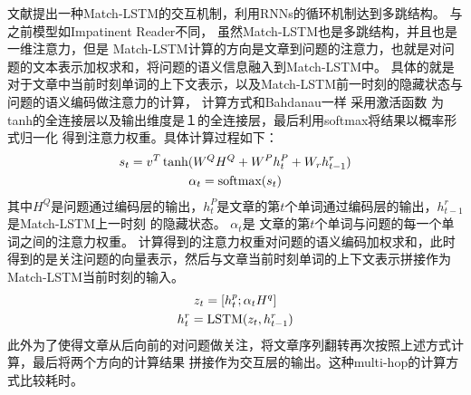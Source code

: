 文献\cite{MatchLSTM}提出一种Match-LSTM的交互机制，利用RNNs的循环机制达到多跳结构。
与之前模型如Impatinent Reader不同，
虽然Match-LSTM也是多跳结构，并且也是一维注意力，但是
Match-LSTM计算的方向是文章到问题的注意力，也就是对问题的文本表示加权求和，将问题的语义信息融入到Match-LSTM中。
具体的就是对于文章中当前时刻单词的上下文表示，以及Match-LSTM前一时刻的隐藏状态与问题的语义编码做注意力的计算，
计算方式和Bahdanau一样
采用激活函数
为tanh的全连接层以及输出维度是１的全连接层，最后利用softmax将结果以概率形式归一化
得到注意力权重。具体计算过程如下：
\begin{gather}
    s_t=v^T\tanh(W^QH^Q+W^Ph_t^P+W_rh_{t-1}^r) \notag \\
    \alpha_{t}=\text{softmax}(s_t)
\end{gather}
其中$H^Q$是问题通过编码层的输出，$h_t^P$是文章的第$t$个单词通过编码层的输出，$h_{t-1}^r$是Match-LSTM上一时刻
的隐藏状态。
$\alpha_{t}$是
文章的第$t$个单词与问题的每一个单词之间的注意力权重。
计算得到的注意力权重对问题的语义编码加权求和，此时得到的是关注问题的向量表示，然后与文章当前时刻单词的上下文表示拼接作为
Match-LSTM当前时刻的输入。
\begin{gather}
    z_t=[h_t^p;\alpha_tH^q] \notag \\
    h_{t}^r=\text{LSTM}(z_t,h_{t-1}^r)
\end{gather}
此外为了使得文章从后向前的对问题做关注，将文章序列翻转再次按照上述方式计算，最后将两个方向的计算结果
拼接作为交互层的输出。这种multi-hop的计算方式比较耗时。








